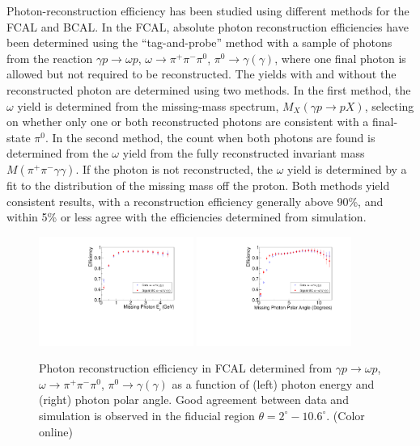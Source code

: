 
Photon-reconstruction efficiency has been studied using different methods for the FCAL and BCAL.  In the FCAL, absolute photon reconstruction efficiencies have been determined using the ``tag-and-probe'' method with a sample of photons from the reaction $\gamma p \to \omega p$, $\omega \to \pi^+\pi^-\pi^0$, $\pi^0 \to \gamma (\gamma)$, where one final photon is allowed but not required to be reconstructed.  The yields with and without the reconstructed photon are determined using two methods.  In the first method, the $\omega$ yield is determined from the missing-mass spectrum, $M_X(\gamma p \rightarrow pX)$, selecting on whether only one or both reconstructed photons are consistent with a final-state $\pi^0$. In the second method,  the count when both photons are found is determined from the $\omega$ yield from the fully reconstructed invariant mass $M(\pi^+\pi^-\gamma\gamma)$. If the photon is not reconstructed, the $\omega$ yield is determined by a fit to the distribution of the missing mass off the proton.  Both methods yield consistent results, with a reconstruction efficiency generally above 90\%, and within 5\% or less agree with the efficiencies determined from simulation.

\begin{figure}[tbp]
\begin{center}
\includegraphics[width=0.45\textwidth]{figures/OmegaCompareE.pdf}
\includegraphics[width=0.45\textwidth]{figures/OmegaCompareTheta.pdf}
\caption{\label{fig:fcalphotoneff}
Photon reconstruction efficiency in FCAL determined from $\gamma p \to \omega p$, $\omega \to \pi^+\pi^-\pi^0$, $\pi^0 \to \gamma (\gamma)$ as a function of (left) photon energy and (right) photon polar angle.  Good agreement between data and simulation is observed in the fiducial region $\theta = 2^\circ - 10.6^\circ$. (Color online)
}
\end{center}
\end{figure}

